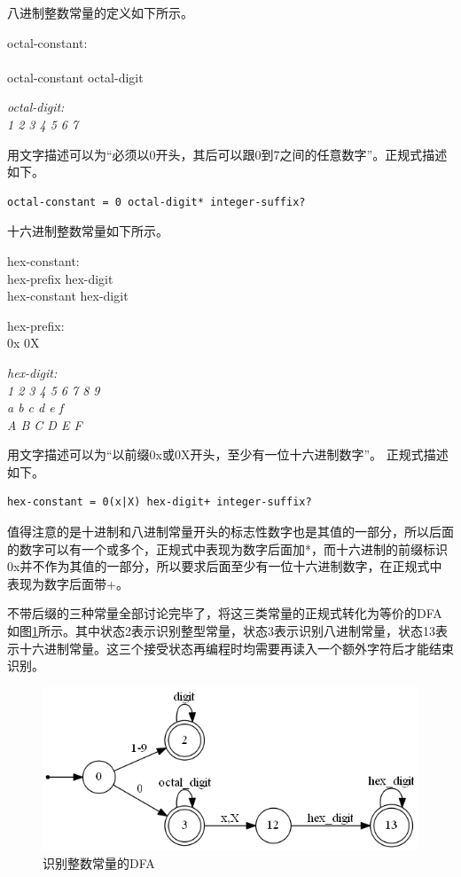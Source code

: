 \documentclass[UTF8, twoside, titlepage]{ctexart}
\newenvironment{lex}
{
	\linespread{1.2}
	\leftskip=2.5cm
	\rightskip=2.5cm
	\itshape
	\setlength{\parindent}{-1cm}
}
{\par}
\begin{document}
八进制整数常量的定义如下所示。

\begin{lex}
octal-constant:\\
{
	{\normalfont {}} \\ 
	octal-constant octal-digit
}

\itshape
octal-digit: \\
{
	\normalfont
	 1 2 3 4 5 6 7
}
\end{lex}

用文字描述可以为“必须以0开头，其后可以跟0到7之间的任意数字”。正规式描述如下。

\begin{lstlisting}
octal-constant = 0 octal-digit* integer-suffix?
\end{lstlisting}

十六进制整数常量如下所示。

\begin{lex}
hex-constant:\\
	hex-prefix hex-digit \\
	hex-constant hex-digit
	
hex-prefix: \\
{
	\normalfont
	\ttfamily
	0x 0X
}

\itshape
hex-digit: \\
{
	\normalfont
	 1 2 3 4 5 6 7 8 9\\
	a b c d e f\\
	A B C D E F
}
\end{lex}

用文字描述可以为“以前缀0x或0X开头，至少有一位十六进制数字”。 正规式描述如下。

\begin{lstlisting}
hex-constant = 0(x|X) hex-digit+ integer-suffix?
\end{lstlisting}

值得注意的是十进制和八进制常量开头的标志性数字也是其值的一部分，所以后面的数字可以有一个或多个，正规式中表现为数字后面加*，而十六进制的前缀标识0x并不作为其值的一部分，所以要求后面至少有一位十六进制数字，在正规式中表现为数字后面带+。

不带后缀的三种常量全部讨论完毕了，将这三类常量的正规式转化为等价的DFA如图\ref{fig:integer}所示。其中状态2表示识别整型常量，状态3表示识别八进制常量，状态13表示十六进制常量。这三个接受状态再编程时均需要再读入一个额外字符后才能结束识别。

\begin{figure}[htbp]
	\centering
	\includegraphics[scale=0.54]{images/integer.png}
	\caption{识别整数常量的DFA}
	\label{fig:integer}
\end{figure}
\end{document}
